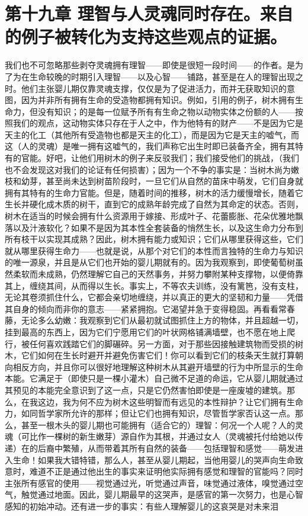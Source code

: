 
\section{第十九章 理智与人灵魂同时存在。来自的例子被转化为支持这些观点的证据。}

我们也不可忽略那些剥夺灵魂拥有理智——即使是很短一段时间——的作者。是为了为在生命较晚的时期引入理智——以及心智——铺路，甚至是在人的理智出现之时。他们主张婴儿期仅靠灵魂支撑，仅仅是为了促进活力，而并无获取知识的意图，因为并非所有拥有生命的受造物都拥有知识。例如，引用的例子，树木拥有生命力，但没有知识；的是每一位赋予所有有生命之物以动物实体之份额的人——按照我们的观点，这动物实体只存在于人之中，作为他特有的财产——不是因为它是天主的化工（其他所有受造物也都是天主的化工），而是因为它是天主的嘘气，而这（人的灵魂）是唯一拥有这嘘气的，我们声称它出生时即已装备齐全，拥有其特有的官能。好吧，让他们用树木的例子来反驳我们；我们接受他们的挑战，（我们也不会发现这对我们的论证有任何损害）；因为一个不争的事实是：当树木尚为嫩枝和幼芽，甚至尚未达到树苗阶段时，一旦它们从自然的苗床中萌发，它们自身就拥有其特有的生命力官能。但是，随着时间的推移，树木的活力缓慢增长，随着它生长并硬化成木质的树干，直到它的成熟年龄完成了自然为其命定的状态。否则，树木在适当的时候会拥有什么资源用于嫁接、形成叶子、花蕾膨胀、花朵优雅地飘落以及汁液软化？如果不是因为其本性全套装备的悄然生长，以及这生命力分布到所有枝干以实现其成熟？因此，树木拥有能力或知识；它们从哪里获得这些，它们就从哪里获得生命力——也就是说，从那个对它们的本性而言独特的生命力与知识的唯一源泉，并且是从它们也开始的婴儿期就有的。因为我观察到，即使葡萄树虽然柔软而未成熟，仍然理解它自己的天然事务，并努力攀附某种支撑物，以便倚靠其上，缠绕其间，从而得以生长。事实上，不等农夫训练，没有篱笆，没有支柱，无论其卷须抓住什么，它都会亲切地缠绕，并以真正的更大的坚韧和力量——凭借其自身的倾向而非你的意志——紧紧拥抱。它渴望并急于变得稳固。再看看常春藤，无论多么幼嫩：我观察到它们从最初就试图抓住上方的物体，并且超越一切，挂到最高的东西上，因为它们宁愿用它们的叶状网格铺满墙壁，也不愿在地上爬行，被任何喜欢践踏它们的脚碾碎。另一方面，对于那些因接触建筑物而受损的树木，它们如何在生长时避开并避免伤害它们！你可以看到它们的枝条天生就打算朝向相反方向，并且你可以很好地理解这种树木从其避开墙壁的行为中所显示的生命本能。它满足于（即使只是一棵小灌木）自己微不足道的命运，它从婴儿期就通过其预见的本能完全意识到了这一点，只是它仍然害怕即使是一座废墟的建筑。那么，在我这边，我为何不应为树木这些明智而有远见的本性辩护？让它们拥有生命力，如同哲学家所允许的那样；但让它们也拥有知识，尽管哲学家否认这一点。那么，甚至一根木头的婴儿期也可能拥有（适合它的）理智：何况一个人呢？人的灵魂（可比作一棵树的新生嫩芽）源自作为其根，并通过女人（灵魂被托付给她以传递）在的后裔中繁殖，从而带着其所有自然的装备——包括理智和感觉——萌发进入生命！如果我大错特错，那么人，甚至从婴儿期起，当他用婴儿的哭声向生命致意时，难道不正是通过他出生的事实来证明他实际拥有感觉和理智的官能吗？同时主张所有感官的使用——视觉通过光，听觉通过声音，味觉通过液体，嗅觉通过空气，触觉通过地面。因此，婴儿期最早的这哭声，是感官的第一次努力，也是心智感知的初始冲动。还有进一步的事实：有些人理解婴儿的这哀哭是对未来泪
